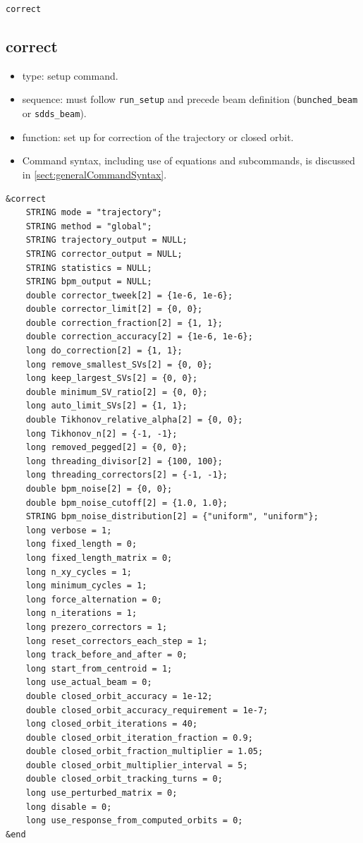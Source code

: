 \documentclass[11pt]{article}
\begin{document}
\newpage
\begin{center}{\Large\verb|correct|}\end{center}
\subsection{correct \label{subsec:correct}}

\begin{itemize}
\item type: setup command.
\item sequence: must follow \verb|run_setup| and precede beam definition (\verb|bunched_beam| or \verb|sdds_beam|).
\item function: set up for correction of the trajectory or closed orbit.
\item Command syntax, including use of equations and subcommands, is discussed in \ref{sect:generalCommandSyntax}.
\end{itemize}

\begin{verbatim}
&correct
    STRING mode = "trajectory";
    STRING method = "global";
    STRING trajectory_output = NULL;
    STRING corrector_output = NULL;
    STRING statistics = NULL;
    STRING bpm_output = NULL;
    double corrector_tweek[2] = {1e-6, 1e-6};
    double corrector_limit[2] = {0, 0};
    double correction_fraction[2] = {1, 1};
    double correction_accuracy[2] = {1e-6, 1e-6};
    long do_correction[2] = {1, 1};
    long remove_smallest_SVs[2] = {0, 0};
    long keep_largest_SVs[2] = {0, 0};
    double minimum_SV_ratio[2] = {0, 0};
    long auto_limit_SVs[2] = {1, 1};
    double Tikhonov_relative_alpha[2] = {0, 0};
    long Tikhonov_n[2] = {-1, -1};
    long removed_pegged[2] = {0, 0};
    long threading_divisor[2] = {100, 100};
    long threading_correctors[2] = {-1, -1};
    double bpm_noise[2] = {0, 0};
    double bpm_noise_cutoff[2] = {1.0, 1.0};
    STRING bpm_noise_distribution[2] = {"uniform", "uniform"};
    long verbose = 1;
    long fixed_length = 0;
    long fixed_length_matrix = 0;
    long n_xy_cycles = 1;
    long minimum_cycles = 1;
    long force_alternation = 0;
    long n_iterations = 1;
    long prezero_correctors = 1;
    long reset_correctors_each_step = 1;
    long track_before_and_after = 0;
    long start_from_centroid = 1;
    long use_actual_beam = 0;
    double closed_orbit_accuracy = 1e-12;
    double closed_orbit_accuracy_requirement = 1e-7;
    long closed_orbit_iterations = 40;
    double closed_orbit_iteration_fraction = 0.9;
    double closed_orbit_fraction_multiplier = 1.05;
    double closed_orbit_multiplier_interval = 5;
    double closed_orbit_tracking_turns = 0;
    long use_perturbed_matrix = 0;
    long disable = 0;
    long use_response_from_computed_orbits = 0;
&end
\end{verbatim}
\end{document}

